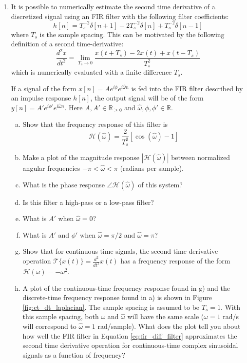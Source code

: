 \begin{enumerate}
\item It is possible to numerically estimate the second time
  derivative of a discretized signal using an FIR filter with the
  following filter coefficients:
  \begin{equation}h[n]= T_s^{-2}\delta[n+1] -2
    T_s^{-2}\delta[n] + T_s^{-2}\delta[n-1]
    \label{eq:fir_diff_filter}
    \end{equation}
  where $T_s$ is the sample spacing. This can be motivated by the following definition of a second time-derivative:
  \begin{equation}
    \frac{d^2x}{dt^2} = \lim_{T_s \rightarrow 0} \frac{x(t+T_s)-2x(t)+x(t-T_s)}{T_s^2}
  \end{equation}
  which is numerically evaluated with a finite difference $T_s$.

 If a signal of the form $x[n]=A e^{i\phi}e^{i\hat{\omega} n }$ is fed into the FIR filter described by an impulse response $h[n]$,
  the output signal will be of the form $y[n]=A' e^{i \phi'} e^{i \hat{\omega}n}$.
  Here $A,A'\in \mathbb{R}_{\ge 0}$ and $\hat{\omega},\phi,\phi' \in \mathbb{R}$.

  
  \begin{enumerate}[a)]
  \item Show that the frequency response of this filter is
    \begin{equation}
      \mathcal{H}(\hat{\omega}) = \frac{2}{T_s^{2}}[\cos(\hat{\omega})-1]
    \end{equation}
  \item Make a plot of the magnitude response $|\mathcal{H}(\hat{\omega})|$ between normalized angular frequencies $-\pi < \hat{\omega} < \pi$ (radians per sample).
  \item What is the phase response $\angle \mathcal{H}(\hat{\omega})$ of this system?
    
  \item Is this filter a high-pass or a low-pass filter? 
  \item What is $A'$ when $\hat{\omega}=0$?
  \item What is $A'$ and $\phi'$ when $\hat{\omega}=\pi/2$ and $\hat{\omega}=\pi$?
  \item Show that for continuous-time signals, the second
    time-derivative operation $\mathcal{T}\{x(t)\} =
    \frac{d^2}{dt^2}x(t)$ has a frequency response of the form
    $\mathcal{H}(\omega)=-\omega^2$.

  \item A plot of the continuous-time frequency response found in g) and the discrete-time frequency response found in a) is shown in Figure \ref{fig:ct_dt_laplacian}. The sample spacing is assumed to be $T_s=1$. With this sample spacing, both $\omega$ and $\hat{\omega}$ will have the same scale ($\omega = 1$ rad/s will correspond to $\hat{\omega}=1$ rad/sample). What does the plot tell you about how well the FIR filter in Equation \ref{eq:fir_diff_filter} approximates the second time derivative operation for continuous-time complex sinusoidal signals as a function of frequency?
\end{enumerate}



\end{enumerate}
